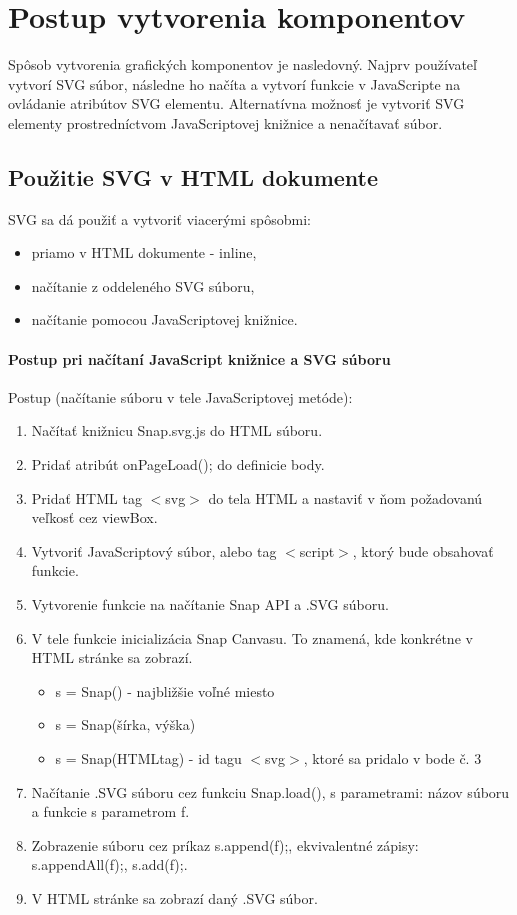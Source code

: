 \chapter{Postup vytvorenia komponentov}

Spôsob vytvorenia grafických komponentov je nasledovný. Najprv používateľ vytvorí SVG súbor, následne ho načíta a vytvorí funkcie v JavaScripte na ovládanie atribútov SVG elementu. 
Alternatívna možnosť je vytvoriť SVG elementy prostredníctvom JavaScriptovej knižnice a nenačítavať súbor. 

\section{Použitie SVG v HTML dokumente}

SVG sa dá použiť a vytvoriť viacerými spôsobmi:
\begin{itemize}
	\item priamo v HTML dokumente - inline, 
	\item načítanie z oddeleného SVG súboru,
	\item načítanie pomocou JavaScriptovej knižnice.
\end{itemize}

\subsubsection{Postup pri načítaní JavaScript knižnice a SVG súboru}

Postup (načítanie súboru v tele JavaScriptovej metóde): 
\begin{enumerate}
	\item Načítať knižnicu Snap.svg.js do HTML súboru. 
	\item Pridať atribút onPageLoad(); do definicie body.
	\item Pridať HTML tag $<$svg$>$ do tela HTML a nastaviť v ňom požadovanú veľkosť cez viewBox.
	\item Vytvoriť JavaScriptový súbor, alebo tag $<$script$>$, ktorý bude obsahovať funkcie. 
	\item Vytvorenie funkcie na načítanie Snap API a .SVG súboru. 
	\item V tele funkcie inicializácia Snap Canvasu. To znamená, kde konkrétne v HTML stránke sa zobrazí.
	\begin{itemize}
		\item s = Snap() - najbližšie voľné miesto
		\item s = Snap(šírka, výška) 
		\item s = Snap(HTMLtag) - id tagu $<$svg$>$, ktoré sa pridalo v bode č. 3
	\end{itemize}
	\item Načítanie .SVG súboru cez funkciu Snap.load(), s parametrami: názov súboru a funkcie s parametrom f. 
	\item Zobrazenie súboru cez príkaz s.append(f);, ekvivalentné zápisy: s.appendAll(f);, s.add(f);. 
	\item V HTML stránke sa zobrazí daný .SVG súbor. 
	
	
\end{enumerate}

